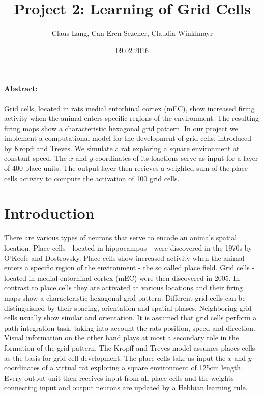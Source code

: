 \documentclass[a4paper, 12pt]{article}
\title{Project 2: Learning of Grid Cells}
\author{Claus Lang, Can Eren Sezener, Claudia Winklmayr}
\date{09.02.2016}
\begin{document}
\maketitle

\paragraph{Abstract:}
Grid cells, located in rats medial entorhinal cortex (mEC), show increased firing activity when the animal enters specific regions of the environment. The resulting firing maps show a characteristic hexagonal grid pattern. In our project we implement a computational model for the development of grid cells, introduced by Kropff and Treves. We simulate a rat exploring a square environment at constant speed. The $x$ and $y$ coordinates of its loactions serve as input for a layer of 400 place units. The output layer then recieves a weighted sum of the place cells activity to compute the activation of 100 grid cells.
 

\section{Introduction}
There are various types of neurons that serve to encode an animals spatial location. Place cells - located in hippocampus - were discovered in the 1970s by O'Keefe and Dostrovsky. Place cells show increased activity when the animal enters a specific region of the environment - the so called place field.\newline
Grid cells - located in medial entorhinal cortex (mEC) were then discovered in 2005. In contrast to place cells they are activated at various locations and their firing maps show a characteristic hexagonal grid pattern. Different grid cells can be distinguished by their spacing, orientation and spatial phases. Neighboring grid cells usually show similar and orientation. \newline
It is assumed that grid cells perform a path integration task, taking into account the rats position, speed and direction. Visual information on the other hand plays at most a secondary role in the formation of the grid pattern. \newline
The Kropff and Treves model assumes places cells as the basis for grid cell development. The place cells take as input the $x$ and $y$ coordinates of a virtual rat exploring a square environment of 125cm length. Every output unit then receives input from all place cells and the weights connecting input and output neurons are updated by a Hebbian learning rule. 
%
%
%
\end{document}
